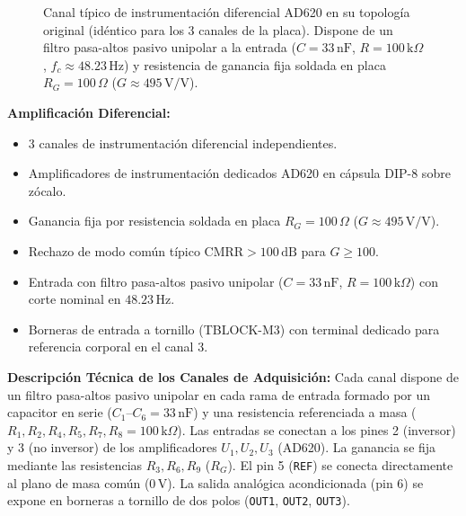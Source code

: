 \documentclass[10pt,a4paper]{article}
\begin{document}
\begin{figure}[H]
{\begin{circuitikz}[american, thick, font=\sffamily]
\end{circuitikz}%
}
\caption{Canal típico de instrumentación diferencial AD620 en su topología original (idéntico para los 3 canales de la placa). Dispone de un filtro pasa-altos pasivo unipolar a la entrada ($C = 33\,\text{nF}$, $R = 100\,\text{k}\Omega$, $f_c \approx 48.23\,\text{Hz}$) y resistencia de ganancia fija soldada en placa $R_G = 100\,\Omega$ ($G \approx 495\,\text{V/V}$).}
\label{fig:esquema_canal_original}
\end{figure}

\vspace{0.3em}
\textbf{Amplificación Diferencial:}
\begin{itemize}
    \item 3 canales de instrumentación diferencial independientes.
    \item Amplificadores de instrumentación dedicados AD620 en cápsula DIP-8 sobre zócalo.
    \item Ganancia fija por resistencia soldada en placa $R_G = 100\,\Omega$ ($G \approx 495\,\text{V/V}$).
    \item Rechazo de modo común típico $\text{CMRR} > 100\,\text{dB}$ para $G \ge 100$.
    \item Entrada con filtro pasa-altos pasivo unipolar ($C = 33\,\text{nF}$, $R = 100\,\text{k}\Omega$) con corte nominal en $48.23\,\text{Hz}$.
    \item Borneras de entrada a tornillo (TBLOCK-M3) con terminal dedicado para referencia corporal en el canal 3.
\end{itemize}

\vspace{0.3em}
\textbf{Descripción Técnica de los Canales de Adquisición:}
Cada canal dispone de un filtro pasa-altos pasivo unipolar en cada rama de entrada formado por un capacitor en serie ($C_1\text{--}C_6 = 33\,\text{nF}$) y una resistencia referenciada a masa ($R_1, R_2, R_4, R_5, R_7, R_8 = 100\,\text{k}\Omega$). Las entradas se conectan a los pines 2 (inversor) y 3 (no inversor) de los amplificadores $U_1, U_2, U_3$ (AD620). La ganancia se fija mediante las resistencias $R_3, R_6, R_9$ ($R_G$). El pin 5 (\texttt{REF}) se conecta directamente al plano de masa común ($0\,\text{V}$). La salida analógica acondicionada (pin 6) se expone en borneras a tornillo de dos polos (\texttt{OUT1}, \texttt{OUT2}, \texttt{OUT3}).

\clearpage

\end{document}
